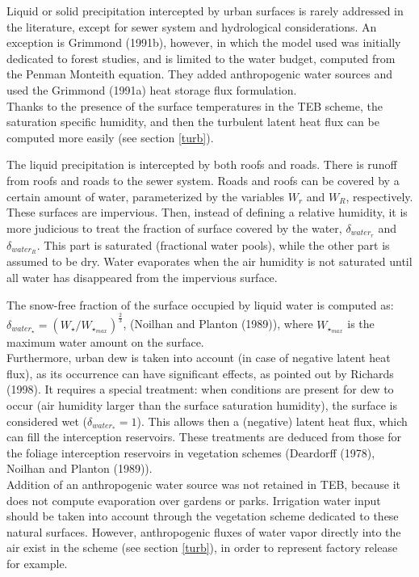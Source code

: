 Liquid or solid precipitation intercepted by urban surfaces is
rarely addressed in the literature,
except for sewer system and hydrological considerations.
An exception is Grimmond \etal (1991b)\nocite{Grimmond1991b}, however,
in which
the model used was initially dedicated to forest studies,
and is limited to the water budget, computed from the
Penman Monteith equation. They added anthropogenic water sources
and used the Grimmond \etal (1991a) heat storage flux
formulation.\\

Thanks to the presence of the surface temperatures in the TEB
scheme, the saturation specific humidity, and then
the turbulent latent heat flux can be computed more easily
(see section \ref{turb}).

The liquid precipitation is intercepted by both roofs and roads.
There is runoff from roofs and roads to the sewer system.
Roads and roofs can be covered by a certain amount of water,
parameterized by the variables $W_{r}$ and $W_{R}$, respectively.
These surfaces are impervious. Then, instead of defining a relative humidity,
it is more judicious to treat the fraction of surface covered by the water,
$\delta_{water_r}$ and $\delta_{water_R}$. This part is saturated
(fractional water pools), while the other part is assumed to be dry.
Water evaporates
when the air humidity is  not saturated until all water has disappeared
from the impervious surface.

The snow-free fraction of the surface occupied by liquid water is computed as:
$\delta_{water_\star}= (W_\star/W_{\star_{max}})^\frac{2}{3}$, (Noilhan and Planton (1989)\nocite{Noilhan1989}), where
$W_{\star_{max}}$ is the maximum water amount on the surface.\\

Furthermore, urban dew
is taken into account (in case of negative latent heat flux),
as its occurrence
can have significant effects, as pointed
out by Richards (1998)\nocite{Richards1998}.
It requires a special treatment: when conditions are present
for dew to occur (air humidity larger than the surface saturation
humidity), the surface is considered wet ($\delta_{water_*}=1$). This allows
then a (negative) latent heat flux, which can fill the interception reservoirs.
These treatments are deduced from those for the foliage interception reservoirs
in vegetation schemes (Deardorff (1978)\nocite{Deardorff1978}, Noilhan and Planton (1989)).\\

Addition of an anthropogenic water source was not retained in TEB,
because it does not compute evaporation over gardens or parks.
Irrigation water input should be taken into account through the vegetation
scheme dedicated to these natural surfaces. However, anthropogenic fluxes
of water vapor directly into the air exist in the scheme (see section
\ref{turb}), in order to represent factory release for example.\\

